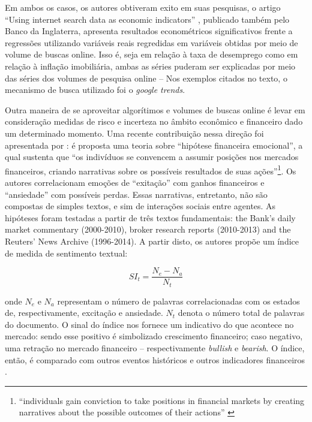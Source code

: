 Em ambos os casos, os autores obtiveram exito em suas pesquisas, o artigo ``Using internet search data as economic indicators'' \cite[p.136]{mclaren2011using}, publicado também pelo Banco da Inglaterra, apresenta resultados econométricos significativos frente a regressões utilizando variáveis reais regredidas em variáveis obtidas por meio de volume de buscas online. Isso é, seja em relação à taxa de desemprego como em relação à inflação imobiliária, ambas as séries puderam ser explicadas por meio das séries dos volumes de pesquisa online -- Nos exemplos citados no texto, o mecanismo de busca utilizado foi o \textit{google trends}.

Outra maneira de se aproveitar algorítimos e volumes de buscas online é levar em consideração medidas de risco e incerteza no âmbito econômico e financeiro dado um determinado momento. Uma recente contribuição nessa direção foi apresentada por : é proposta uma teoria sobre ``hipótese financeira emocional'', a qual sustenta que ``os indivíduos se convencem a assumir posições nos mercados financeiros, criando narrativas sobre os possíveis resultados de suas ações''\footnote{``individuals gain conviction to take positions in financial markets by creating narratives about the possible outcomes of their actions'' \cite{nyman2018news, bholat2015text}}. Os autores correlacionam emoções de ``exitação'' com ganhos financeiros e ``ansiedade'' com possíveis perdas. Essas narrativas, entretanto, não são compostas de simples textos, e sim de interações sociais entre agentes. As hipóteses foram testadas a partir de três textos fundamentais: the Bank’s daily market commentary (2000-2010), broker research reports (2010-2013) and the Reuters’ News Archive (1996-2014). A partir disto, os autores propõe um índice de medida de sentimento textual:

$$SI_t=\frac{N_e - N_a}{N_t}$$ 

\noindent
onde $N_e$ e $N_a$ representam o número de palavras correlacionadas com os estados de, respectivamente, excitação e ansiedade. $N_t$ denota o número total de palavras do documento. O sinal do índice nos fornece um indicativo do que acontece no mercado: sendo esse positivo é simbolizado crescimento financeiro; caso negativo, uma retração no mercado financeiro -- respectivamente \textit{bullish} e \textit{bearish}.
O índice, então, é comparado com outros eventos históricos e outros indicadores financeiros \cite{bholat2015text}. 


